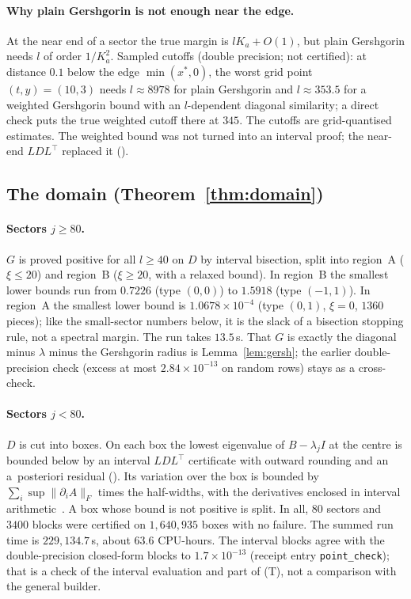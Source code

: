\documentclass[11pt]{article}
\theoremstyle{definition}
\theoremstyle{remark}
\begin{document}
\paragraph{Why plain Gershgorin is not enough near the edge.} At the near end of a sector the true margin is
$lK_a+O(1)$, but plain Gershgorin needs $l$ of order $1/K_a^2$. Sampled cutoffs (double precision; not certified): at
distance $0.1$ below the edge $\min(x^*,0)$, the worst grid point $(t,y)=(10,3)$ needs $l\approx8978$ for plain
Gershgorin and $l\approx353.5$ for a weighted Gershgorin bound with an $l$-dependent diagonal similarity; a direct check
puts the true weighted cutoff there at $345$. The cutoffs are grid-quantised estimates. The weighted bound was not
turned into an interval proof; the near-end $LDL^\top$ replaced it ().

\subsection{The domain (Theorem~\ref{thm:domain})}\label{app:domain}

\paragraph{Sectors $j\ge80$.} $G$ is proved positive for all $l\ge40$ on $D$ by interval bisection, split into region~A
($\xi\le20$) and region~B ($\xi\ge20$, with a relaxed bound). In region~B the smallest lower bounds run from $0.7226$ (type
$(0,0)$) to $1.5918$ (type $(-1,1)$). In region~A the smallest lower bound is $1.0678\times10^{-4}$ (type $(0,1)$, $\xi=0$,
$1360$ pieces); like the small-sector numbers below, it is the slack of a bisection stopping rule, not a spectral margin.
The run takes $13.5$\,s. That $G$ is exactly the diagonal minus $\lambda$ minus the Gershgorin radius is
Lemma~\ref{lem:gersh}; the earlier double-precision check (excess at most $2.84\times10^{-13}$ on random rows) stays as a
cross-check.

\paragraph{Sectors $j<80$.} $D$ is cut into boxes. On each box the lowest eigenvalue of $B-\lambda_jI$ at the centre is
bounded below by an interval $LDL^\top$ certificate with outward rounding and an a~posteriori residual
(). Its variation over the box is bounded by $\sum_i\sup\lVert\partial_iA\rVert_F$
times the half-widths, with the derivatives enclosed in interval arithmetic~\cite{mpmath}. A box whose bound is not
positive is split. In all, $80$ sectors and $3400$ blocks were certified on $1{,}640{,}935$ boxes with no failure. The
summed run time is $229{,}134.7$\,s, about $63.6$ CPU-hours. The interval blocks agree with the double-precision
closed-form blocks to $1.7\times10^{-13}$ (receipt entry \texttt{point\_check}); that is a check of the interval
evaluation and part of (T), not a comparison with the general builder.
\end{document}
